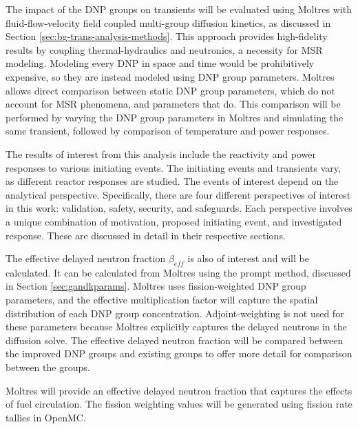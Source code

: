The impact of the \gls{DNP} groups on transients will be evaluated using Moltres with fluid-flow-velocity field coupled multi-group diffusion kinetics, as discussed in Section \ref{sec:bg-trans-analysis-methods}.
This approach provides high-fidelity results by coupling thermal-hydraulics and neutronics, a necessity for \gls{MSR} modeling.
Modeling every \gls{DNP} in space and time would be prohibitively expensive, so they are instead modeled using \gls{DNP} group parameters.
Moltres allows direct comparison between static \gls{DNP} group parameters, which do not account for \gls{MSR} phenomena, and parameters that do.
This comparison will be performed by varying the \gls{DNP} group parameters in Moltres and simulating the same transient, followed by comparison of temperature and power responses.

The results of interest from this analysis include the reactivity and power responses to various initiating events.
The initiating events and transients vary, as different reactor responses are studied.
The events of interest depend on the analytical perspective.
Specifically, there are four different perspectives of interest in this work: validation, safety, security, and safeguards.
Each perspective involves a unique combination of motivation, proposed initiating event, and investigated response.
These are discussed in detail in their respective sections.

The effective delayed neutron fraction $\beta_{eff}$ is also of interest and will be calculated.
It can be calculated from Moltres using the prompt method, discussed in Section \ref{sec:gandkparams}.
Moltres uses fission-weighted \gls{DNP} group parameters, and the effective multiplication factor will capture the spatial distribution of each \gls{DNP} group concentration.
Adjoint-weighting is not used for these parameters because Moltres explicitly captures the delayed neutrons in the diffusion solve.
The effective delayed neutron fraction will be compared between the improved \gls{DNP} groups and existing groups to offer more detail for comparison between the groups.

Moltres will provide an effective delayed neutron fraction that captures the effects of fuel circulation.
The fission weighting values will be generated using fission rate tallies in OpenMC.

